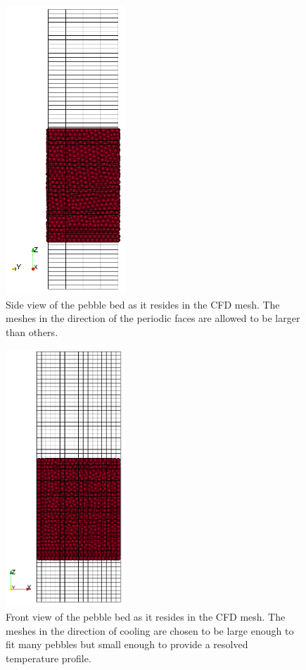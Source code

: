\begin{figure}[t]
	\centering
	\includegraphics[width=0.4\textwidth]{figures/x-side-view}
    \caption{Side view of the pebble bed as it resides in the CFD mesh. The meshes in the direction of the periodic faces are allowed to be larger than others.}\label{fig:cfdem-domain-x}
\end{figure}

\begin{figure}[t]
	\centering
	\includegraphics[width=0.4\textwidth]{figures/y-side-view}
    \caption{Front view of the pebble bed as it resides in the CFD mesh. The meshes in the direction of cooling are chosen to be large enough to fit many pebbles but small enough to provide a resolved temperature profile.}\label{fig:cfdem-domain-y}
\end{figure}

